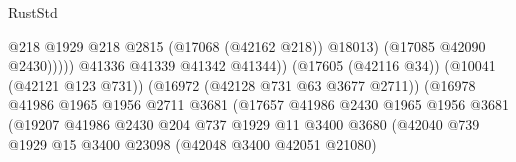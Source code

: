 \begin{lexlean}{RustStd}
\begin{coremodule}
                                                              @218
                                                              @1929
                                                              @218
                                                              @2815
                                                              (@17068 (@42162 @218))
                                                              @18013)
                                                            (@17085 @42090 @2430)))))
                                                    @41336
                                                    @41339
                                                    @41342
                                                    @41344))
                                                (@17605 (@42116 @34))
                                                (@10041 (@42121 @123 @731))
                                                (@16972 (@42128 @731 @63 @3677 @2711))
                                                (@16978
                                                  @41986
                                                  @1965
                                                  @1956
                                                  @2711
                                                  @3681
                                                  (@17657
                                                    @41986
                                                    @2430
                                                    @1965
                                                    @1956
                                                    @3681
                                                    (@19207
                                                      @41986
                                                      @2430
                                                      @204
                                                      @737
                                                      @1929
                                                      @11
                                                      @3400
                                                      @3680
                                                      (@42040
                                                        @739
                                                        @1929
                                                        @15
                                                        @3400
                                                        @23098
                                                        (@42048 @3400 @42051 @21080)

\end{coremodule}
\end{lexlean}
